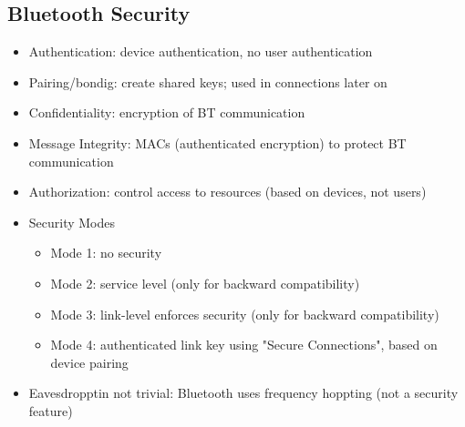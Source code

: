 \subsection{Bluetooth Security}
\begin{itemize}
  \item Authentication: device authentication, no user authentication
  \item Pairing/bondig: create shared keys; used in connections later on 
  \item Confidentiality: encryption of BT communication 
  \item Message Integrity: MACs (authenticated encryption) to protect BT communication 
  \item Authorization: control access to resources (based on devices, not users) 
  \item Security Modes 
    \begin{itemize}
      \item Mode 1: no security
      \item Mode 2: service level (only for backward compatibility) 
      \item Mode 3: link-level enforces security (only for backward compatibility) 
      \item Mode 4: authenticated link key using "Secure Connections", based on device pairing 
    \end{itemize}
  \item Eavesdropptin not trivial: Bluetooth uses frequency hoppting (not a security feature) 
\end{itemize}

